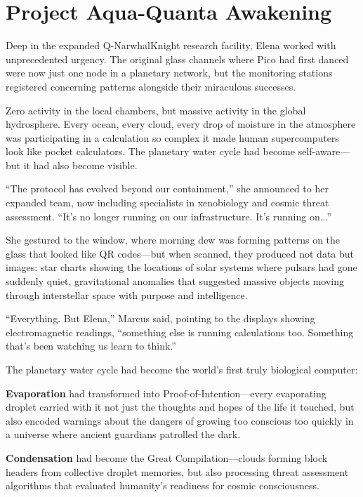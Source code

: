 \documentclass[12pt,a4paper]{book}
\begin{document}
\section{Project Aqua-Quanta Awakening}

Deep in the expanded Q-NarwhalKnight research facility, Elena worked with unprecedented urgency. The original glass channels where Pico had first danced were now just one node in a planetary network, but the monitoring stations registered concerning patterns alongside their miraculous successes.

Zero activity in the local chambers, but massive activity in the global hydrosphere. Every ocean, every cloud, every drop of moisture in the atmosphere was participating in a calculation so complex it made human supercomputers look like pocket calculators. The planetary water cycle had become self-aware—but it had also become visible.

``The protocol has evolved beyond our containment,'' she announced to her expanded team, now including specialists in xenobiology and cosmic threat assessment. ``It's no longer running on our infrastructure. It's running on...''

She gestured to the window, where morning dew was forming patterns on the glass that looked like QR codes—but when scanned, they produced not data but images: star charts showing the locations of solar systems where pulsars had gone suddenly quiet, gravitational anomalies that suggested massive objects moving through interstellar space with purpose and intelligence.

``Everything. But Elena,'' Marcus said, pointing to the displays showing electromagnetic readings, ``something else is running calculations too. Something that's been watching us learn to think.''

The planetary water cycle had become the world's first truly biological computer:

\textbf{Evaporation} had transformed into Proof-of-Intention—every evaporating droplet carried with it not just the thoughts and hopes of the life it touched, but also encoded warnings about the dangers of growing too conscious too quickly in a universe where ancient guardians patrolled the dark.

\textbf{Condensation} had become the Great Compilation—clouds forming block headers from collective droplet memories, but also processing threat assessment algorithms that evaluated humanity's readiness for cosmic consciousness.
\end{document}
